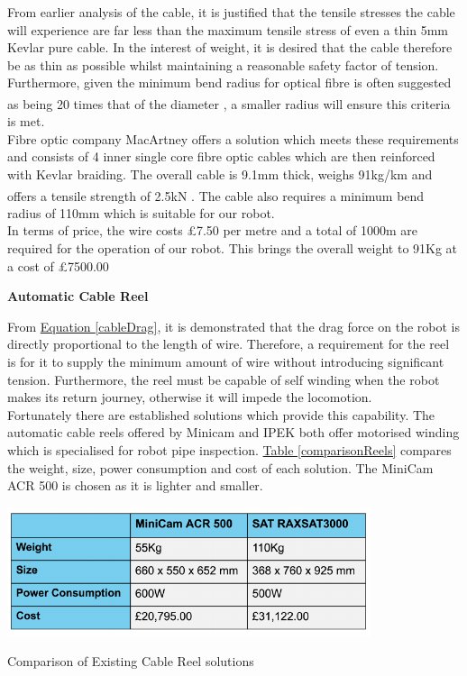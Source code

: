 \documentclass[11pt]{article}		%
\newcommand{\supercite}[1]{\textsuperscript{\cite{#1}}}		%
\newcommand{\equationref}[1]{\hyperref[#1]{Equation \ref*{#1}}}     %
\newcommand{\tableref}[1]{\hyperref[#1]{Table \ref*{#1}}}     %
\begin{document}
		    From earlier analysis of the cable, it is justified that the tensile stresses the cable will experience are far less than the maximum tensile stress of even a thin 5mm Kevlar pure cable. In the interest of weight, it is desired that the cable therefore be as thin as possible whilst maintaining a reasonable safety factor of tension. Furthermore, given the minimum bend radius for optical fibre is often suggested as being 20 times that of the diameter \supercite{fibrebend}, a smaller radius will ensure this criteria is met.\\
  	    	\hspace*{3ex}Fibre optic company MacArtney offers a solution which meets these requirements and consists of 4 inner single core fibre optic cables which are then reinforced with Kevlar braiding. The overall cable is 9.1mm thick, weighs 91kg/km and offers a tensile strength of 2.5kN \supercite{macartney}. The cable also requires a minimum bend radius of 110mm which is suitable for our robot. \\
  	    	\hspace*{3ex}In terms of price, the wire costs £7.50 per metre and a total of 1000m are required for the operation of our robot. This brings the overall weight to 91Kg at a cost of £7500.00 
		    	    	
		    \textbf{Automatic Cable Reel}
	
	        From \equationref{cableDrag}, it is demonstrated that the drag force on the robot is directly proportional to the length of wire. 
	        Therefore, a requirement for the reel is for it to supply the minimum amount of wire without introducing significant tension. 
	        Furthermore, the reel must be capable of self winding when the robot makes its return journey, otherwise it will impede the locomotion.
	        \\ 
	        \hspace*{3ex}Fortunately there are established solutions which provide this capability. 
	        The automatic cable reels offered by Minicam and IPEK both offer motorised winding which is specialised for robot pipe inspection. 
	        \tableref{comparisonReels} compares the weight, size, power consumption and cost of each solution. 
	        The MiniCam ACR 500 is chosen as it is lighter and smaller. 
	
	     
	        \begin{table}[h]
				\centering
				\includegraphics[width=0.8\textwidth]{tablecables}
				\caption{Comparison of Existing Cable Reel solutions}
				\label{comparisonReels}
			\end{table}
	        
\end{document}
